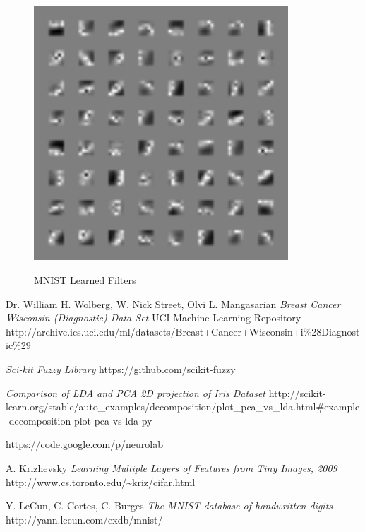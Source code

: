 \documentclass{article}
\begin{document}
\begin{figure}[h!]
    \caption{MNIST Learned Filters}
  \centering
    \includegraphics[width=0.85\textwidth]{figure_6.png}
  \label{fig:f6}
\end{figure}

\begin{thebibliography}{9}
  Dr. William H. Wolberg, W. Nick Street, Olvi L. Mangasarian 
  \emph{Breast Cancer Wisconsin (Diagnostic) Data Set}
  UCI Machine Learning Repository 
  http://archive.ics.uci.edu/ml/datasets/Breast+Cancer+Wisconsin+i\%28Diagnostic\%29
                                                                                        
  \emph{Sci-kit Fuzzy Library}
  https://github.com/scikit-fuzzy                       
                                                                                        
    \emph{Comparison of LDA and PCA 2D projection of Iris Dataset}
    http://scikit-learn.org/stable/auto\_examples/decomposition/plot\_pca\_vs\_lda.html\#example-decomposition-plot-pca-vs-lda-py

    https://code.google.com/p/neurolab

    A. Krizhevsky
    \emph{Learning Multiple Layers of Features from Tiny Images, 2009}
    http://www.cs.toronto.edu/\textasciitilde kriz/cifar.html

    Y. LeCun, C. Cortes, C. Burges
    \emph{The MNIST database of handwritten digits}
    http://yann.lecun.com/exdb/mnist/
                                                                                        
\end{thebibliography}
\end{document}
